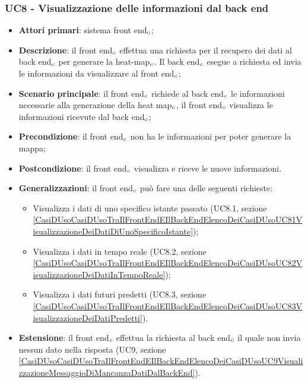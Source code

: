 \subsubsection{UC8 - Visualizzazione delle informazioni dal back end}\label{CasiDUsoCasiDUsoTraIlFrontEndEIlBackEndElencoDeiCasiDUsoUC8VisualizzazioneDelleInformazioniDalBackEnd}

\begin{itemize}
	\item \textbf{Attori primari}: sistema front end$_{\scaleto{G}{3pt}}$;
	\item \textbf{Descrizione}: il front end$_{\scaleto{G}{3pt}}$ effettua una richiesta per il recupero dei dati al back end$_{\scaleto{G}{3pt}}$ per generare la heat-map$_{\scaleto{G}{3pt}}$. Il back end$_{\scaleto{G}{3pt}}$ esegue a richiesta ed invia le informazioni da visualizzare al front end$_{\scaleto{G}{3pt}}$;
	\item \textbf{Scenario principale}: il front end$_{\scaleto{G}{3pt}}$ richiede al back end$_{\scaleto{G}{3pt}}$ le informazioni necessarie alla generazione della heat map$_{\scaleto{G}{3pt}}$, il front end$_{\scaleto{G}{3pt}}$ visualizza le informazioni ricevute dal back end$_{\scaleto{G}{3pt}}$;
	\item \textbf{Precondizione}: il front end$_{\scaleto{G}{3pt}}$ non ha le informazioni per poter generare la mappa;
	\item \textbf{Postcondizione}: il front end$_{\scaleto{G}{3pt}}$ visualizza e riceve le nuove informazioni.
	\item \textbf{Generalizzazioni}: il front end$_{\scaleto{G}{3pt}}$ può fare una delle seguenti richieste:
	\begin{itemize}
		\item Visualizza i dati di uno specifico istante passato (UC8.1, sezione \ref{CasiDUsoCasiDUsoTraIlFrontEndEIlBackEndElencoDeiCasiDUsoUC81VisualizzazioneDeiDatiDiUnoSpecificoIstante});
		\item Visualizza i dati in tempo reale (UC8.2, sezione  \ref{CasiDUsoCasiDUsoTraIlFrontEndEIlBackEndElencoDeiCasiDUsoUC82VisualizzazioneDeiDatiInTempoReale});
		\item Visualizza i dati futuri predetti (UC8.3, sezione  \ref{CasiDUsoCasiDUsoTraIlFrontEndEIlBackEndElencoDeiCasiDUsoUC83VisualizzazioneDeiDatiPredetti}).
	\end{itemize}
	\item \textbf{Estensione}: il front end$_{\scaleto{G}{3pt}}$ effettua la richiesta al back end$_{\scaleto{G}{3pt}}$ il quale non invia nessun dato nella risposta (UC9, sezione \ref{CasiDUsoCasiDUsoTraIlFrontEndEIlBackEndElencoDeiCasiDUsoUC9VisualizzazioneMessaggioDiMancanzaDatiDalBackEnd}).
\end{itemize}

